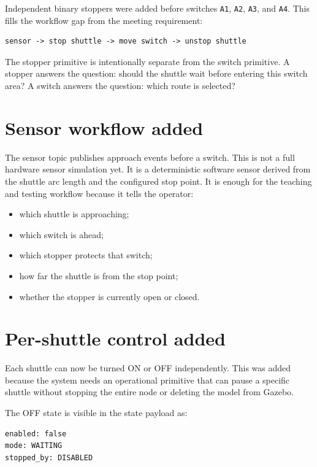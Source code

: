 \documentclass[12pt,a4paper]{report}
\begin{document}
Independent binary stoppers were added before switches \texttt{A1},
\texttt{A2}, \texttt{A3}, and \texttt{A4}. This fills the workflow gap from the
meeting requirement:

\begin{lstlisting}[style=terminalcode]
sensor -> stop shuttle -> move switch -> unstop shuttle
\end{lstlisting}

The stopper primitive is intentionally separate from the switch primitive. A
stopper answers the question: should the shuttle wait before entering this
switch area? A switch answers the question: which route is selected?

\section{Sensor workflow added}

The sensor topic publishes approach events before a switch. This is not a full
hardware sensor simulation yet. It is a deterministic software sensor derived
from the shuttle arc length and the configured stop point. It is enough for the
teaching and testing workflow because it tells the operator:

\begin{itemize}
\item which shuttle is approaching;
\item which switch is ahead;
\item which stopper protects that switch;
\item how far the shuttle is from the stop point;
\item whether the stopper is currently open or closed.
\end{itemize}

\section{Per-shuttle control added}

Each shuttle can now be turned ON or OFF independently. This was added because
the system needs an operational primitive that can pause a specific shuttle
without stopping the entire node or deleting the model from Gazebo.

The OFF state is visible in the state payload as:

\begin{lstlisting}[style=terminalcode]
enabled: false
mode: WAITING
stopped_by: DISABLED
\end{lstlisting}
\end{document}
